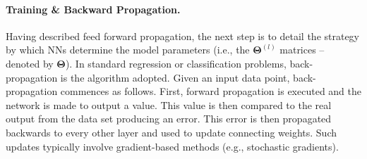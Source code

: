\paragraph{Training \& Backward Propagation.} Having described feed forward propagation, the next step is to detail the strategy by which NNs determine the model parameters (i.e., the $\bm{\Theta}^{(l)}$ matrices -- denoted by $\bm{\Theta}$). In standard regression or classification problems, back-propagation is the algorithm adopted. Given an input data point, back-propagation commences as follows. First, forward propagation is executed and the network is made to output a value. This value is then compared to the real output from the data set producing an error. This error is then propagated backwards to every other layer and used to update connecting weights. Such updates typically involve gradient-based methods (e.g., stochastic gradients). 
